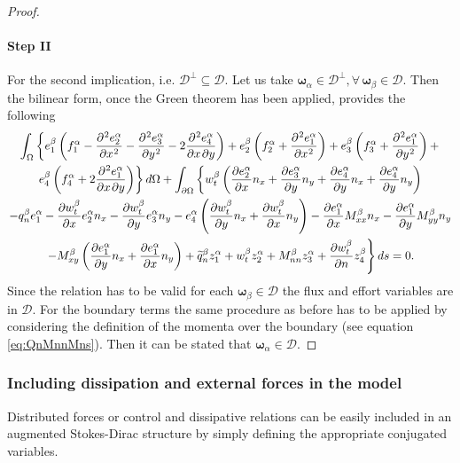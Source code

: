 \documentclass[11pt]{article}
\begin{document}
\begin{proof}
		\paragraph{\textbf{Step II}}
		For the second implication, i.e. $\mathcal{D}^{\perp} \subseteq \mathcal{D}$. Let us take $\bm\omega_\alpha \in \mathcal{D}^{\perp}, \forall \, \bm\omega_\beta \in \mathcal{D}$. Then the bilinear form, once the Green theorem has been applied, provides the following
		\begin{multline}
		\int_{\Omega} \left\{ e_1^\beta \left( f_1^\alpha - \diffp[2]{e_2^\alpha}{x} - \diffp[2]{e_3^\alpha}{y} - 2 \diffp{e_4^\alpha}{x,y}  \right) + e_2^\beta \left( f_2^\alpha + \diffp[2]{e_1^\alpha}{x}  \right) + e_3^\beta \left( f_3^\alpha + \diffp[2]{e_1^\alpha}{y}  \right) + \right. \\
		\left. e_4^\beta \left( f_4^\alpha + 2 \diffp{e_1^\alpha}{x,y}  \right)  \right\} d\Omega + \int_{\partial \Omega} \left\{ w_t^\beta \left( \diffp{e_2^\alpha}{x} n_x + \diffp{e_3^\alpha}{y} n_y + \diffp{e_4^\alpha}{y} n_x + \diffp{e_4^\alpha}{y} n_y  \right)  \right. \\
		\left.  - q_n^\beta e_1^\alpha - \diffp{w_t^\beta}{x} e_2^\alpha n_x - \diffp{w_t^\beta}{y} e_3^\alpha n_y   - e_4^\alpha \left( \diffp{w_t^\beta}{y} n_x + \diffp{w_t^\beta}{x} n_y  \right) - \diffp{e_1^\alpha}{x} M_{xx}^\beta n_x  - \diffp{e_1^\alpha}{y} M_{yy}^\beta n_y \right.  \\ 
		\left. - M_{xy}^\beta \left(\diffp{e_1^\alpha}{y} n_x + \diffp{e_1^\alpha}{x} n_y  \right) + \widetilde{q}_n^\beta z_1^\alpha + w_t^\beta z_2^\alpha + M_{nn}^\beta z_3^\alpha + \diffp{w_t^\beta}{n} z_4^\beta \right\} ds = 0. 
		\end{multline}
		Since the relation has to be valid for each $\bm\omega_\beta \in \mathcal{D}$ the flux and effort variables are in $\mathcal{D}$. For the boundary terms the same procedure as before has to be applied by considering the definition of the momenta over the boundary (see equation \eqref{eq:QnMnnMns}). Then it can be stated that $\bm\omega_\alpha \in \mathcal{D}$.
	\end{proof}
	
	\subsubsection{Including dissipation and external forces in the model}
	Distributed forces or control and dissipative relations can be easily included in an augmented Stokes-Dirac structure by simply defining the appropriate conjugated variables. \\
	
\end{document}
